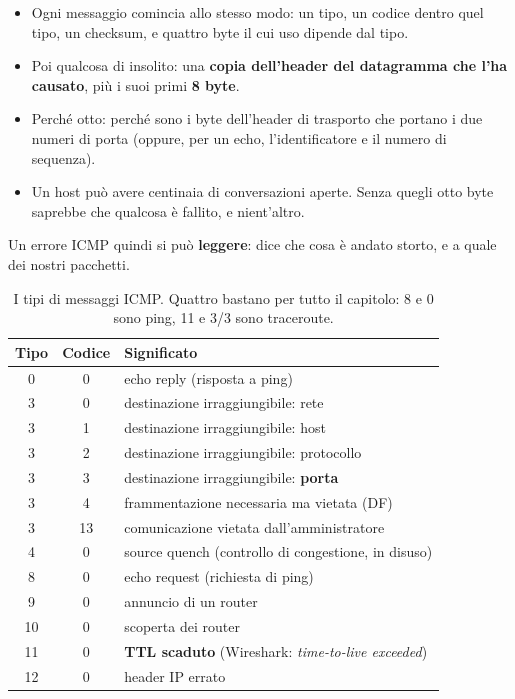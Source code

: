 \begin{itemize}
    \item Ogni messaggio comincia allo stesso modo: un tipo, un codice dentro quel tipo, un checksum, e quattro byte il cui uso
          dipende dal tipo.
    \item Poi qualcosa di insolito: una \textbf{copia dell'header del datagramma che l'ha causato}, più i suoi primi
          \textbf{8 byte}.
    \item Perché otto: perché sono i byte dell'header di trasporto che portano i due numeri di porta (oppure, per un echo,
          l'identificatore e il numero di sequenza).
    \item Un host può avere centinaia di conversazioni aperte. Senza quegli otto byte saprebbe che qualcosa è fallito, e
          nient'altro.
\end{itemize}
Un errore ICMP quindi si può \textbf{leggere}: dice che cosa è andato storto, e a quale dei nostri pacchetti.

\begin{table}[H]
\centering
\begin{tabular}{ccl}
\toprule
\textbf{Tipo} & \textbf{Codice} & \textbf{Significato} \\
\midrule
0  & 0  & echo reply (risposta a ping) \\
3  & 0  & destinazione irraggiungibile: rete \\
3  & 1  & destinazione irraggiungibile: host \\
3  & 2  & destinazione irraggiungibile: protocollo \\
3  & 3  & destinazione irraggiungibile: \textbf{porta} \\
3  & 4  & frammentazione necessaria ma vietata (DF) \\
3  & 13 & comunicazione vietata dall'amministratore \\
4  & 0  & source quench (controllo di congestione, in disuso) \\
8  & 0  & echo request (richiesta di ping) \\
9  & 0  & annuncio di un router \\
10 & 0  & scoperta dei router \\
11 & 0  & \textbf{TTL scaduto} (Wireshark: \emph{time-to-live exceeded}) \\
12 & 0  & header IP errato \\
\bottomrule
\end{tabular}
\caption{I tipi di messaggi ICMP. Quattro bastano per tutto il capitolo: 8 e 0 sono ping, 11 e 3/3 sono traceroute.}
\end{table}

